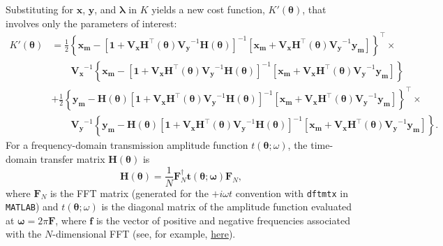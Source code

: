 \documentclass[aps, prb, onecolumn, floatfix, amssymb, superscriptaddress, nofootinbib, longbibliography]{revtex4-2}
\begin{document}
Substituting for $\bm{x}$, $\bm{y}$, and $\bm{\lambda}$ in $K$ yields a new cost function, $K'(\bm{\theta})$, that involves only the parameters of interest:
\begin{align}
K'(\boldsymbol{\theta}) &= \frac{1}{2}\left\{\mathbf{x_m} - \left[\mathbf{1} + \mathbf{V_{x}}\mathbf{H}^\intercal(\boldsymbol{\theta})\mathbf{V_{y}}^{-1}\mathbf{H}(\boldsymbol{\theta})\right]^{-1}\left[\mathbf{x_{m}} + \mathbf{V_{x}}\mathbf{H}^\intercal(\boldsymbol{\theta})\mathbf{V_{y}}^{-1}\mathbf{y_{m}}\right]\right\}^\intercal\times\\
&\qquad\mathbf{V_x}^{-1}\left\{\mathbf{x_m} - \left[\mathbf{1} + \mathbf{V_{x}}\mathbf{H}^\intercal(\boldsymbol{\theta})\mathbf{V_{y}}^{-1}\mathbf{H}(\boldsymbol{\theta})\right]^{-1}\left[\mathbf{x_{m}} + \mathbf{V_{x}}\mathbf{H}^\intercal(\boldsymbol{\theta})\mathbf{V_{y}}^{-1}\mathbf{y_{m}}\right]\right\}\\
&+ \frac{1}{2}\left\{\mathbf{y_m} - \mathbf{H}(\boldsymbol{\theta})\left[\mathbf{1} + \mathbf{V_{x}}\mathbf{H}^\intercal(\boldsymbol{\theta})\mathbf{V_{y}}^{-1}\mathbf{H}(\boldsymbol{\theta})\right]^{-1}\left[\mathbf{x_{m}} + \mathbf{V_{x}}\mathbf{H}^\intercal(\boldsymbol{\theta})\mathbf{V_{y}}^{-1}\mathbf{y_{m}}\right]\right\}^\intercal\times\\
&\qquad\mathbf{V_y}^{-1}\left\{\mathbf{y_m} - \mathbf{H}(\boldsymbol{\theta})\left[\mathbf{1} + \mathbf{V_{x}}\mathbf{H}^\intercal(\boldsymbol{\theta})\mathbf{V_{y}}^{-1}\mathbf{H}(\boldsymbol{\theta})\right]^{-1}\left[\mathbf{x_{m}} + \mathbf{V_{x}}\mathbf{H}^\intercal(\boldsymbol{\theta})\mathbf{V_{y}}^{-1}\mathbf{y_{m}}\right]\right\}.
\end{align}
For a frequency-domain transmission amplitude function $t(\bm{\theta};\omega)$, the time-domain transfer matrix $\bm{H}(\bm{\theta})$ is
\[
\mathbf{H}(\boldsymbol{\theta}) = \frac{1}{N}\bm{F}_N^\dagger \mathbf{t}(\boldsymbol{\theta};\boldsymbol{\omega}) \bm{F}_N,
\]
where $\bm{F}_N$ is the FFT matrix (generated for the $+i\omega t$ convention with \texttt{dftmtx} in \texttt{MATLAB}) and $t(\bm{\theta};\omega)$ is the diagonal matrix of the amplitude function evaluated at $\bm{\omega} = 2\pi\bm{F}$, where $\bm{f}$ is the vector of positive and negative frequencies associated with the $N$-dimensional FFT (see, for example, \href{https://www.mathworks.com/matlabcentral/answers/141271-what-are-the-frequencies-when-n-in-fft-x-n-is-odd here}{here}).
\end{document}

